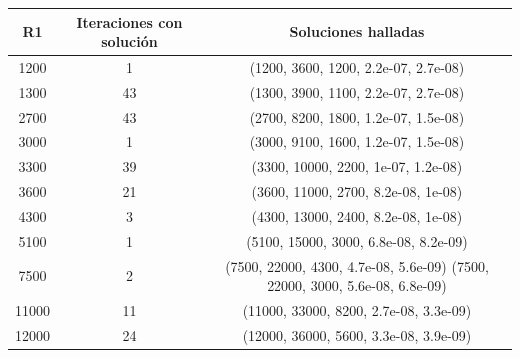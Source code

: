 \documentclass{llncs}
\begin{document}
		\begin{longtable}{|c|c|c|}
		\label{table:ResultadosDiscretoPuro}\\
		\multicolumn{1}{|c|}{R1} & \multicolumn{1}{c|}{Iteraciones con solución} & \multicolumn{1}{c|}{Soluciones halladas} \\ \hline
		1200                     &                   1                               &       (1200, 3600, 1200, 2.2e-07, 2.7e-08)                                   \\ \hline
		1300                     &                  43                             &       (1300, 3900, 1100, 2.2e-07, 2.7e-08)                                       \\ \hline
		2700                     &                  43                             &       (2700, 8200, 1800, 1.2e-07, 1.5e-08)                                     \\ \hline
		3000                     &                  1                               &       (3000, 9100, 1600, 1.2e-07, 1.5e-08)                                        \\ \hline
		3300                     &                 39                              &      (3300, 10000, 2200, 1e-07, 1.2e-08)                                         \\ \hline
		3600                     &                 21                               &     (3600, 11000, 2700, 8.2e-08, 1e-08)                                         \\ \hline
		4300                     &                  3                                &     (4300, 13000, 2400, 8.2e-08, 1e-08)                                         \\ \hline
		5100                     &                    1                               &     (5100, 15000, 3000, 6.8e-08, 8.2e-09)                                       \\ \hline
		7500                     &                    2                               &     (7500, 22000, 4300, 4.7e-08, 5.6e-09) \newline
		(7500, 22000, 3000, 5.6e-08, 6.8e-09)                                      \\ \hline
		11000                     &                  11                               &     (11000, 33000, 8200, 2.7e-08, 3.3e-09)                                     \\ \hline
		12000                     &                  24                               &     (12000, 36000, 5600, 3.3e-08, 3.9e-09) \newline

\end{longtable}
\end{document}
